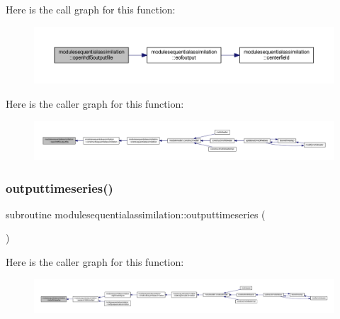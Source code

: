 Here is the call graph for this function\+:\nopagebreak
\begin{figure}[H]
\begin{center}
\leavevmode
\includegraphics[width=350pt]{namespacemodulesequentialassimilation_a6440d55f49615b21ea0d328d0121e669_cgraph}
\end{center}
\end{figure}
Here is the caller graph for this function\+:\nopagebreak
\begin{figure}[H]
\begin{center}
\leavevmode
\includegraphics[width=350pt]{namespacemodulesequentialassimilation_a6440d55f49615b21ea0d328d0121e669_icgraph}
\end{center}
\end{figure}
\mbox{\label{namespacemodulesequentialassimilation_a484eaebcabbe127119b8f5623e94c654}} 
\subsubsection{\texorpdfstring{outputtimeseries()}{outputtimeseries()}}
{\footnotesize\ttfamily subroutine modulesequentialassimilation\+::outputtimeseries (\begin{DoxyParamCaption}{ }\end{DoxyParamCaption})\hspace{0.3cm}{\ttfamily [private]}}

Here is the caller graph for this function\+:\nopagebreak
\begin{figure}[H]
\begin{center}
\leavevmode
\includegraphics[width=350pt]{namespacemodulesequentialassimilation_a484eaebcabbe127119b8f5623e94c654_icgraph}
\end{center}
\end{figure}
\mbox{\label{namespacemodulesequentialassimilation_a8c49e08db24e999a05be06bf048eeb25}} 
